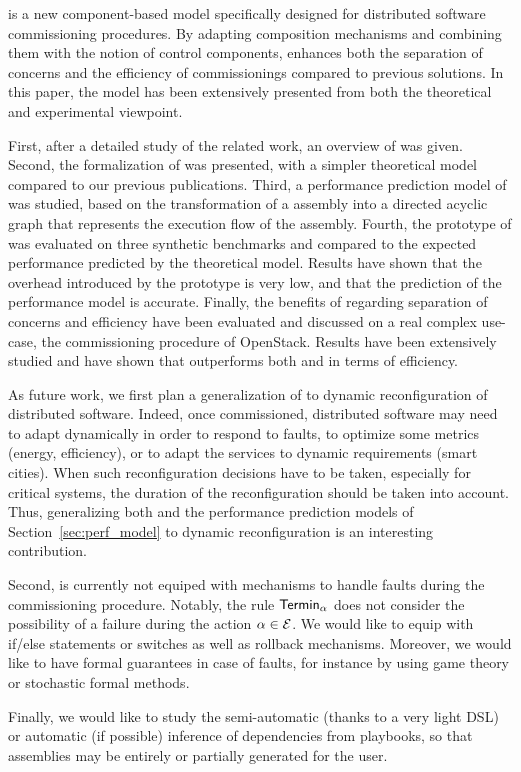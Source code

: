 \mad is a new component-based model specifically designed for
distributed software commissioning procedures. By adapting composition
mechanisms and combining them with the notion of control components, \mad
enhances both the separation of concerns and the efficiency of
commissionings compared to previous solutions. In this paper, the \mad
model has been extensively presented from both the theoretical and
experimental viewpoint.

First, after a detailed study of the related work, an overview of \mad
was given. Second, the formalization of \mad was presented, with a
simpler theoretical model compared to our previous
publications. Third, a performance prediction model of \mad was
studied, based on the transformation of a \mad assembly into a
directed acyclic graph that represents the execution flow of the
assembly. Fourth, the prototype of \mad was evaluated on three
synthetic benchmarks and compared to the expected performance
predicted by the theoretical model. Results have shown that the
overhead introduced by the prototype is very low, and that the prediction
of the performance model is accurate. Finally, the benefits of \mad regarding
separation of concerns and efficiency have been evaluated and
discussed on a real complex use-case, the commissioning procedure of
OpenStack. Results have been extensively studied and have shown that
\mad outperforms both \ansible and \aeolus in terms of efficiency.

As future work, we first plan a generalization of \mad to dynamic
reconfiguration of distributed software. Indeed, once commissioned,
distributed software may need to adapt dynamically in order to respond
to faults, to optimize some metrics (\eg energy, efficiency), or to
adapt the services to dynamic requirements (\eg smart cities). When
such reconfiguration decisions have to be taken, especially for
critical systems, the duration of the reconfiguration should be taken
into account. Thus, generalizing both \mad and the performance
prediction models of Section~\ref{sec:perf_model} to dynamic
reconfiguration is an interesting contribution.

Second, \mad is currently not equiped with mechanisms to handle faults
during the commissioning procedure. Notably, the rule $\mathsf{Termin}_\alpha$
does not consider the possibility of a failure during the action
$\alpha \in \mathcal{E}$. We would like to equip \mad with if/else
statements or switches as well as rollback mechanisms. Moreover, we
would like to have formal guarantees in case of faults, for instance
by using game theory or stochastic formal methods.

Finally, we would like to study the semi-automatic (thanks to a very
light DSL) or automatic (if possible) inference of dependencies from
\ansible playbooks, so that \mad assemblies may be entirely or
partially generated for the user.

  
